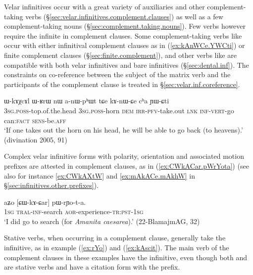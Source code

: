 Velar infinitives occur with a great variety of auxiliaries and other complement-taking verbs (§\ref{sec:velar.infinitives.complement.clauses}) as well as a few complement-taking nouns (§\ref{sec:complement.taking.nouns}). Few verbs however require the infinite in complement clauses. Some complement-taking verbs like  occur with either infinitival complement clauses as in (\ref{ex:kAnWCe.YWCti}) or finite complement clauses (§\ref{sec:finite.complement}), and other verbs like  are compatible with both velar infinitives and bare infinitives (§\ref{sec:dental.inf}). The constraints on co-reference between the subject of the matrix verb and the participants of the complement clause is treated in §\ref{sec:velar.inf.coreference}.

\begin{exe}
\ex \label{ex:kAnWCe.YWCti}
 \gll  ɯ-kɤχcɤl ɯ-ʁrɯ nɯ a-nɯ-pʰɯt tɕe kɤ-nɯ-ɕe cʰa ɲɯ-ɕti \\
 \textsc{3sg}.\textsc{poss}-top.of.the.head \textsc{3sg}.\textsc{poss}-horn \textsc{dem} \textsc{irr}-\textsc{pfv}-take.out \textsc{lnk} \textsc{inf}-\textsc{vert}-go can:\textsc{fact} \textsc{sens}-be.\textsc{aff} \\
\glt `If one takes out the horn on his head, he will be able to go back (to heavens).' (divination 2005, 91)
\end{exe}
 
 Complex velar infinitive forms with polarity, orientation and associated motion prefixes are attested in complement clauses, as in (\ref{ex:CWkACar.pWrYota}) (see also for instance \ref{ex:CWkAXtW} and \ref{ex:mAkACe.mAkhW} in §\ref{sec:infinitives.other.prefixes}).
 
\begin{exe}
\ex \label{ex:CWkACar.pWrYota}
 \gll aʑo [ɕɯ-kɤ-ɕar] pɯ-rɲo-t-a. \\
 \textsc{1sg} \textsc{tral}-\textsc{inf}-search \textsc{aor}-experience-\textsc{tr}:\textsc{pst}-\textsc{1sg} \\
 \glt `I did go to search (for \textit{Amanita caesarea}).'  (22-BlamajmAG, 32)
\end{exe}

Stative verbs, when occurring in a complement clause, generally take the  infinitive, as in example  (\ref{ex:rYo}) and (\ref{ex:kAscit}). The main verb of the complement clauses in these examples have the  infinitive, even though both  and  are stative verbs and have a citation form with the  prefix.

